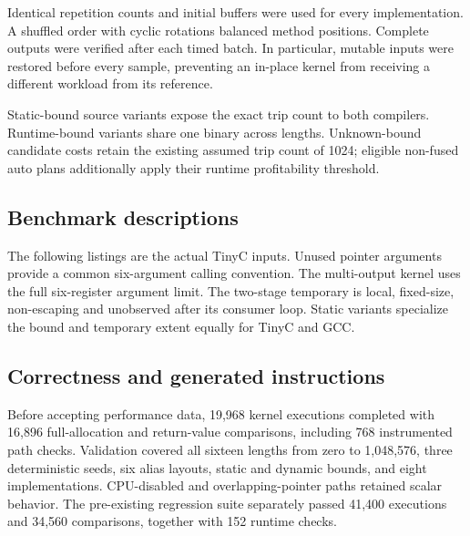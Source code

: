Identical repetition counts and initial buffers were used for every implementation. A shuffled order with cyclic rotations balanced method positions. Complete outputs were verified after each timed batch. In particular, mutable inputs were restored before every sample, preventing an in-place kernel from receiving a different workload from its reference.

Static-bound source variants expose the exact trip count to both compilers. Runtime-bound variants share one binary across lengths. Unknown-bound candidate costs retain the existing assumed trip count of 1024; eligible non-fused auto plans additionally apply their runtime profitability threshold.

\subsection{Benchmark descriptions}

The following listings are the actual TinyC inputs. Unused pointer arguments provide a common six-argument calling convention. The multi-output kernel uses the full six-register argument limit. The two-stage temporary is local, fixed-size, non-escaping and unobserved after its consumer loop. Static variants specialize the bound and temporary extent equally for TinyC and GCC.









\subsection{Correctness and generated instructions}

Before accepting performance data, 19,968 kernel executions completed with 16,896 full-allocation and return-value comparisons, including 768 instrumented path checks. Validation covered all sixteen lengths from zero to 1,048,576, three deterministic seeds, six alias layouts, static and dynamic bounds, and eight implementations. CPU-disabled and overlapping-pointer paths retained scalar behavior. The pre-existing regression suite separately passed 41,400 executions and 34,560 comparisons, together with 152 runtime checks.

